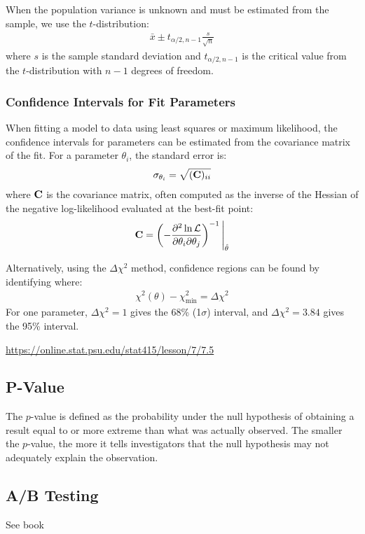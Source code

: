 When the population variance is unknown and must be estimated from the sample, we use the $t$-distribution:
\begin{align}
	\bar{x} \pm t_{\alpha/2, n-1} \frac{s}{\sqrt{n}}
\end{align}
where $s$ is the sample standard deviation and $t_{\alpha/2, n-1}$ is the critical value from the $t$-distribution with $n-1$ degrees of freedom.

\subsubsection{Confidence Intervals for Fit Parameters}
When fitting a model to data using least squares or maximum likelihood, the confidence intervals for parameters can be estimated from the covariance matrix of the fit. For a parameter $\theta_i$, the standard error is:
\begin{align}
	\sigma_{\theta_i} = \sqrt{(\textbf{C})_{ii}}
\end{align}
where $\textbf{C}$ is the covariance matrix, often computed as the inverse of the Hessian of the negative log-likelihood evaluated at the best-fit point:
\begin{align}
	\textbf{C} = \left( -\frac{\partial^2 \ln \mathcal{L}}{\partial \theta_i \partial \theta_j} \right)^{-1}\Bigg|_{\hat{\theta}}
\end{align}

Alternatively, using the $\Delta\chi^2$ method, confidence regions can be found by identifying where:
\begin{align}
	\chi^2(\theta) - \chi^2_{\min} = \Delta\chi^2
\end{align}
For one parameter, $\Delta\chi^2 = 1$ gives the 68\% (1$\sigma$) interval, and $\Delta\chi^2 = 3.84$ gives the 95\% interval.


\url{https://online.stat.psu.edu/stat415/lesson/7/7.5}
\subsection{P-Value}
The $p$-value is defined as the probability under the null hypothesis of obtaining a result equal to or more extreme than what was actually observed. The smaller the $p$-value, the more it tells investigators that the null hypothesis may not adequately explain the observation.


\subsection{A/B Testing}
See book \cite{grus}


